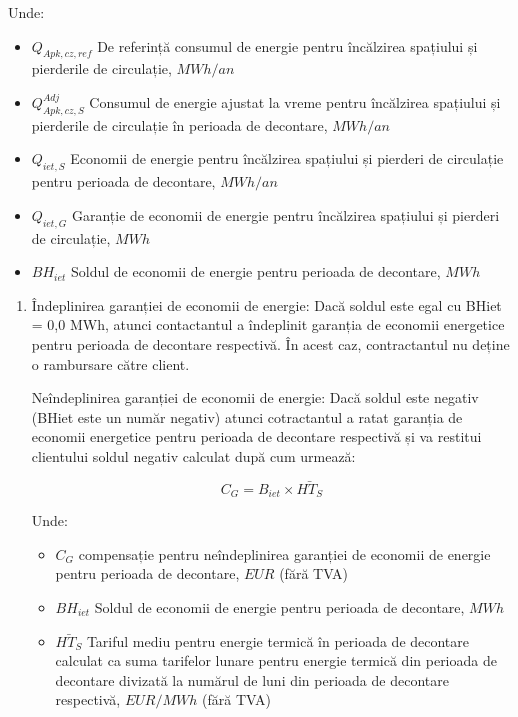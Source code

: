 \begin{enumerate}
\begin{enumerate}
\begin{enumerate}
Unde:
\begin{itemize}[label={}]
  \item $Q_{Apk,cz,ref}$ \quad De referință consumul de energie pentru încălzirea spațiului și pierderile de circulație, $MWh/an$
  \item $Q_{Apk,cz,S}^{Adj}$ \quad  Consumul de energie ajustat la vreme pentru încălzirea spațiului și pierderile de circulație în perioada de decontare, $MWh/an$
  \item $Q_{iet,S}$ \quad \quad Economii de energie pentru încălzirea spațiului și pierderi de circulație pentru perioada de decontare, $MWh/an$
  \item $Q_{iet,G}$ \quad \quad Garanție de economii de energie pentru încălzirea spațiului și pierderi de circulație, $MWh$
  \item $BH_{iet}$ \quad \quad Soldul de economii de energie pentru perioada de decontare, $MWh$
\end{itemize}

\begin{enumerate}
\item Îndeplinirea garanției de economii de energie: Dacă soldul este egal cu BHiet = 0,0 MWh, atunci contactantul a îndeplinit garanția de economii energetice pentru perioada de decontare respectivă. În acest caz, contractantul nu deține o rambursare către client.

  Neîndeplinirea garanției de economii de energie: Dacă soldul este negativ (BHiet este un număr negativ) atunci cotractantul a ratat garanția de economii energetice pentru perioada de decontare respectivă și va restitui clientului soldul negativ calculat după cum urmează:

\[ C_G = B_{iet} \times \bar{HT_S} \]

Unde:
\begin{itemize}[label={}]
\item $C_{G}$ \quad \quad compensație pentru neîndeplinirea garanției de economii de energie pentru perioada de decontare, $EUR$ (fără TVA)
\item $BH_{iet}$ \quad \quad Soldul de economii de energie pentru perioada de decontare, $MWh$
\item $\bar{HT_{S}}$ \quad \quad Tariful mediu pentru energie termică în perioada de decontare calculat ca suma tarifelor lunare pentru energie termică din perioada de decontare divizată la numărul de luni din perioada de decontare respectivă, $EUR/MWh$ (fără TVA)
\end{itemize}


\end{enumerate}
\end{enumerate}
\end{enumerate}
\end{enumerate}

